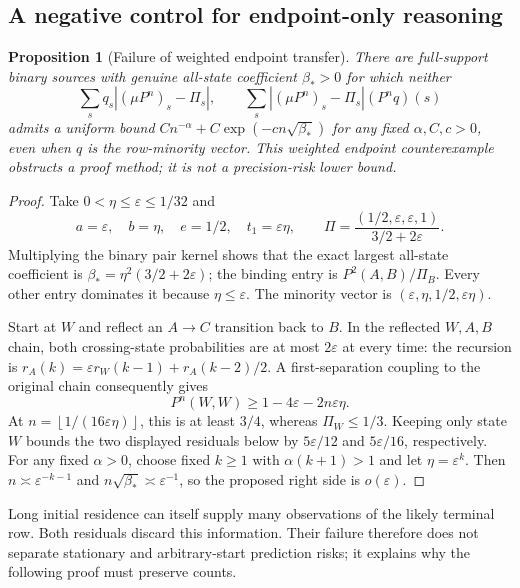 \documentclass[11pt,letterpaper]{article}
\newtheorem{proposition}[theorem]{Proposition}
\theoremstyle{definition}\newtheorem{definition}[theorem]{Definition}
\theoremstyle{remark}\newtheorem{remark}[theorem]{Remark}
\newcommand{\floor}[1]{\left\lfloor #1\right\rfloor}
\begin{document}
\subsection{A negative control for endpoint-only reasoning}
\begin{proposition}[Failure of weighted endpoint transfer]\label{prop:mixingfailure}
There are full-support binary sources with genuine all-state coefficient $\beta_*>0$ for which neither
\[
 \sum_s q_s|(\mu P^n)_s-\Pi_s|,
 \qquad
 \sum_s|(\mu P^n)_s-\Pi_s|(P^nq)(s)
\]
admits a uniform bound
$C n^{-\alpha}+C\exp(-cn\sqrt{\beta_*})$
for any fixed $\alpha,C,c>0$, even when $q$ is the row-minority vector. This weighted endpoint counterexample obstructs a proof method; it is not a precision-risk lower bound.
\end{proposition}
\begin{proof}
Take $0<\eta\le\varepsilon\le1/32$ and
\[
 a=\varepsilon,\quad b=\eta,\quad e=1/2,\quad t_1=\varepsilon\eta,
 \qquad
 \Pi=\frac{(1/2,\varepsilon,\varepsilon,1)}{3/2+2\varepsilon}.
\]
Multiplying the binary pair kernel shows that the exact largest all-state coefficient is
$\beta_*=\eta^2(3/2+2\varepsilon)$; the binding entry is $P^2(A,B)/\Pi_B$. Every other entry dominates it because $\eta\le\varepsilon$. The minority vector is $(\varepsilon,\eta,1/2,\varepsilon\eta)$.

Start at $W$ and reflect an $A\to C$ transition back to $B$. In the reflected $W,A,B$ chain, both crossing-state probabilities are at most $2\varepsilon$ at every time: the recursion is
$r_A(k)=\varepsilon r_W(k-1)+r_A(k-2)/2$.
A first-separation coupling to the original chain consequently gives
\[
 P^n(W,W)\ge1-4\varepsilon-2n\varepsilon\eta .
\]
At $n=\floor{1/(16\varepsilon\eta)}$, this is at least $3/4$, whereas $\Pi_W\le1/3$. Keeping only state $W$ bounds the two displayed residuals below by $5\varepsilon/12$ and $5\varepsilon/16$, respectively. For any fixed $\alpha>0$, choose fixed $k\ge1$ with $\alpha(k+1)>1$ and let $\eta=\varepsilon^k$. Then
$n\asymp\varepsilon^{-k-1}$ and $n\sqrt{\beta_*}\asymp\varepsilon^{-1}$, so the proposed right side is $o(\varepsilon)$.
\end{proof}

Long initial residence can itself supply many observations of the likely terminal row. Both residuals discard this information. Their failure therefore does not separate stationary and arbitrary-start prediction risks; it explains why the following proof must preserve counts.
\end{document}
